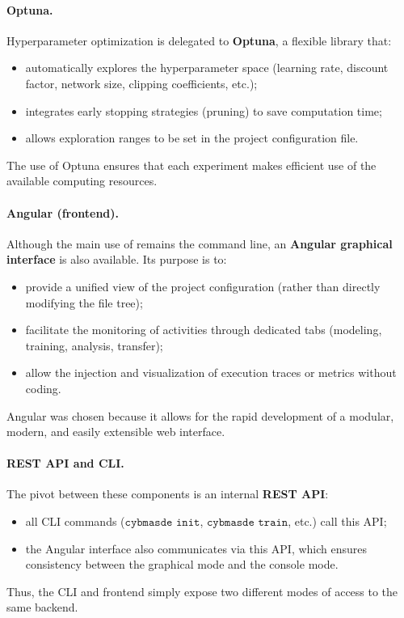 \paragraph{Optuna.}
Hyperparameter optimization is delegated to \textbf{Optuna}, a flexible library that:
\begin{itemize}
  \item automatically explores the hyperparameter space (learning rate, discount factor, network size, clipping coefficients, etc.);
  \item integrates early stopping strategies (pruning) to save computation time;
  \item allows exploration ranges to be set in the project configuration file.
\end{itemize}
The use of Optuna ensures that each experiment makes efficient use of the available computing resources.

\paragraph{Angular (frontend).}
Although the main use of  remains the command line, an \textbf{Angular graphical interface} is also available.
Its purpose is to:
\begin{itemize}
  \item provide a unified view of the project configuration (rather than directly modifying the file tree);
  \item facilitate the monitoring of activities through dedicated tabs (modeling, training, analysis, transfer);
  \item allow the injection and visualization of execution traces or metrics without coding.
\end{itemize}
Angular was chosen because it allows for the rapid development of a modular, modern, and easily extensible web interface.

\paragraph{REST API and CLI.}
The pivot between these components is an internal \textbf{REST API}:
\begin{itemize}
  \item all CLI commands ($\texttt{cybmasde init}$, $\texttt{cybmasde train}$, etc.) call this API;
  \item the Angular interface also communicates via this API, which ensures consistency between the graphical mode and the console mode.
\end{itemize}
Thus, the CLI and frontend simply expose two different modes of access to the same backend.

